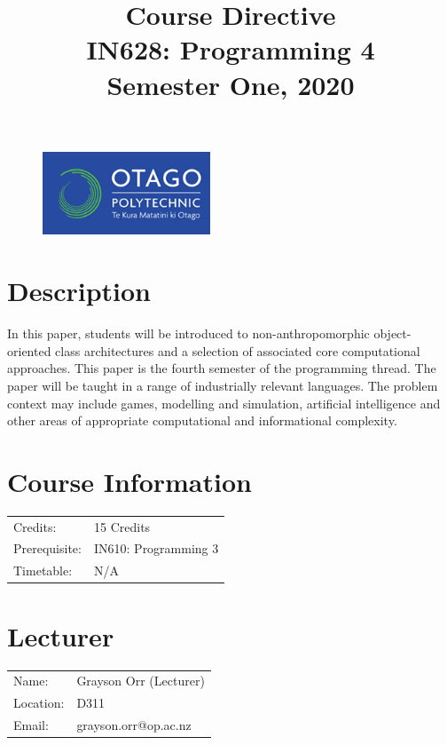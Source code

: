 \documentclass{article}
\author{}
\begin{document}
\begin{figure}
	\includegraphics[width=50mm]{../../resources/img/logo.png}
\end{figure}

\title{Course Directive\\IN628: Programming 4\\Semester One, 2020}
\date{}
\maketitle

\section*{Description}
In this paper, students will be introduced to non-anthropomorphic object-oriented class architectures and a selection of associated core computational approaches. This paper is the fourth semester of the programming thread. The paper will be taught in a range of industrially relevant languages. The problem context may include games, modelling and simulation, artificial intelligence and other areas of appropriate computational and informational complexity.

\section*{Course Information}
\begin{tabular}{ll}
	Credits:      & 15 Credits           \\
	Prerequisite: & IN610: Programming 3 \\
	Timetable:    & N/A                  \\
\end{tabular}

\section*{Lecturer}
\begin{tabular}{ll}
	Name:     & Grayson Orr (Lecturer) \\
	Location: & D311                   \\
	Email:    & grayson.orr@op.ac.nz   \\
\end{tabular}
\end{document}
